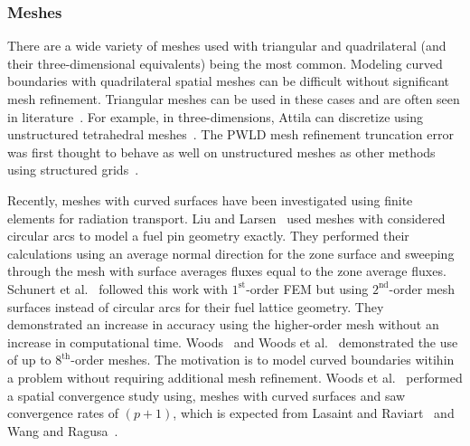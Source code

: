 \documentclass{article}
\begin{document}


\subsubsection{Meshes}

There are a wide variety of meshes used with triangular and quadrilateral (and their three-dimensional equivalents) being the most common. Modeling curved boundaries with quadrilateral spatial meshes can be difficult without significant mesh refinement. Triangular meshes can be used in these cases and are often seen in literature~\cite{ReedTriangularMesh,WangHODGTransport,WangDGFEMConvergence, MorelLLDrz}. For example, in three-dimensions, Attila can discretize using unstructured tetrahedral meshes~\cite{WareingAttila}. The PWLD mesh refinement truncation error was first thought to behave as well on unstructured meshes as other methods using structured grids~\cite{StonePLFEM}.

Recently, meshes with curved surfaces have been investigated using finite elements for radiation transport. Liu and Larsen~\cite{Liu2015SNCurvedMesh} used meshes with considered circular arcs to model a fuel pin geometry exactly. They performed their calculations using an average normal direction for the zone surface and sweeping through the mesh with surface averages fluxes equal to the zone average fluxes. Schunert et al.~\cite{Schunert2017HOMeshes} followed this work with $1^\text{st}$-order FEM but using $2^\text{nd}$-order mesh surfaces instead of circular arcs for their fuel lattice geometry. They demonstrated an increase in accuracy using the higher-order mesh without an increase in computational time. Woods~\cite{WoodsThesis} and Woods et al.~\cite{WoodsHoDgfemXyCurved} demonstrated the use of up to $8^\text{th}$-order meshes.
The motivation is to model curved boundaries witihin a problem without requiring additional mesh refinement. Woods et al.~\cite{WoodsHoDgfemXyCurved} performed a spatial convergence study using, meshes with curved surfaces and saw convergence rates of $(p+1)$, which is expected from Lasaint and Raviart~\cite{LasaintFEM} and Wang and Ragusa~\cite{WangHODGTransport}.
\end{document}
